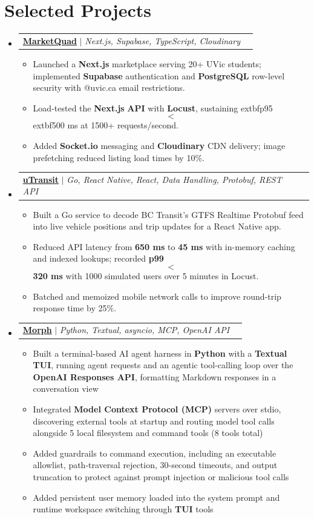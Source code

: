 \documentclass[letterpaper,10pt]{article}
\makeatletter
\newcommand{\resumeItem}[1]{
  \item\small{
    {#1 \vspace{-1pt}}
  }
}
\newcommand{\resumeProjectHeading}[2]{
    \item
    \begin{tabularx}{0.97\textwidth}{@{}Xr@{}}
      \small#1 & #2 \\
    \end{tabularx}\vspace{-6pt}
}
\newcommand{\resumeSubHeadingListStart}{\begin{itemize}[leftmargin=0.15in, label={}]}
\newcommand{\resumeSubHeadingListEnd}{\end{itemize}}
\newcommand{\resumeItemListStart}{\begin{itemize}[label=$\bullet$, itemsep=0.15pt, topsep=0pt, parsep=0pt]}
\newcommand{\resumeItemListEnd}{\end{itemize}\vspace{-2pt}}
\makeatother
\begin{document}
\section{Selected Projects}
\resumeSubHeadingListStart
\resumeProjectHeading{\href{https://github.com/samnne/marketquad}{\textbf{MarketQuad}} $|$ \emph{Next.js, Supabase, TypeScript, Cloudinary}}{}
\resumeItemListStart
  \resumeItem{Launched a \textbf{Next.js} marketplace serving 20+ UVic students; implemented \textbf{Supabase} authentication and \textbf{PostgreSQL} row-level security with @uvic.ca email restrictions.}
  \resumeItem{Load-tested the \textbf{Next.js} \textbf{API} with \textbf{Locust}, sustaining 	extbf{p95} $$<$$ 	extbf{500 ms} at 1500+ requests/second.}
  \resumeItem{Added \textbf{Socket.io} messaging and \textbf{Cloudinary} CDN delivery; image prefetching reduced listing load times by 10\%.}
\resumeItemListEnd
\resumeProjectHeading{\href{https://github.com/samnne/utransit}{\textbf{uTransit}} $|$ \emph{Go, React Native, React, Data Handling, Protobuf, REST API}}{}
\resumeItemListStart
  \resumeItem{Built a Go service to decode BC Transit's GTFS Realtime Protobuf feed into live vehicle positions and trip updates for a React Native app.}
  \resumeItem{Reduced API latency from \textbf{650 ms} to \textbf{45 ms} with in-memory caching and indexed lookups; recorded \textbf{p99} $$<$$ \textbf{320 ms} with 1000 simulated users over 5 minutes in Locust.}
  \resumeItem{Batched and memoized mobile network calls to improve round-trip response time by 25\%.}
\resumeItemListEnd
\resumeProjectHeading{\href{https://github.com/samnne/morph-ai}{\textbf{Morph}} $|$ \emph{Python, Textual, asyncio, MCP, OpenAI API}}{}
\resumeItemListStart
  \resumeItem{Built a terminal-based AI agent harness in \textbf{Python} with a \textbf{Textual} \textbf{TUI}, running agent requests and an agentic tool-calling loop over the \textbf{OpenAI Responses \textbf{API}}, formatting Markdown responses in a conversation view}
  \resumeItem{Integrated \textbf{Model Context Protocol (\textbf{MCP})} servers over stdio, discovering external tools at startup and routing model tool calls alongside 5 local filesystem and command tools (8 tools total)}
  \resumeItem{Added guardrails to command execution, including an executable allowlist, path-traversal rejection, 30-second timeouts, and output truncation to protect against prompt injection or malicious tool calls}
  \resumeItem{Added persistent user memory loaded into the system prompt and runtime workspace switching through \textbf{TUI} tools}
\resumeItemListEnd
\resumeSubHeadingListEnd
\end{document}
